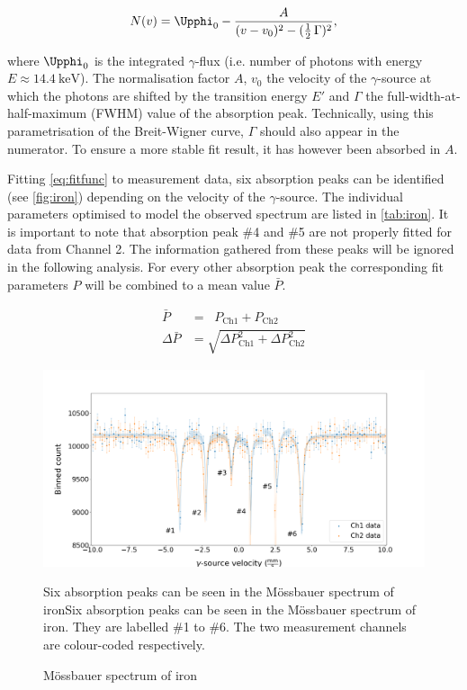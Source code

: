 \begin{equation}
\label{eq:fitfunc}
N(v) = \Upphi_0 - \frac{A}{(v-v_0)^2 - (\frac{1}{2}\,\Gamma)^2},
\end{equation}

where $\Upphi_0$ is the integrated $\gamma$-flux (i.e. number of photons with energy 
$E\approx\SI{14.4}{\kilo\electronvolt}$). The normalisation factor $A$, $v_0$ the 
velocity of the $\gamma$-source at which the photons are shifted by the transition 
energy $E'$ and $\Gamma$ the full-width-at-half-maximum (FWHM) value of the 
absorption peak. Technically, using this parametrisation of the Breit-Wigner curve, 
$\Gamma$ should also appear in the numerator. To ensure a more stable fit result, 
it has however been absorbed in $A$.

Fitting \autoref{eq:fitfunc} to measurement data, six absorption peaks can be 
identified (see \autoref{fig:iron}) depending on the velocity of the $\gamma$-source.
The individual parameters optimised to model the observed spectrum are listed in 
\autoref{tab:iron}. It is important to note that absorption peak \#4 and \#5 are not 
properly fitted for data from Channel 2. The information gathered from these peaks
will be ignored in the following analysis. For every other absorption peak the
corresponding fit parameters $P$ will be combined to a mean value $\bar{P}$.



\begin{align*}
	\bar{P} &= \;\;P_\text{Ch1} + P_\text{Ch2} \\[0.5cm]
	\Delta\bar{P} &= \sqrt{\Delta P_\text{Ch1}^2 + \Delta P_\text{Ch2}^2  } 
\end{align*}

\begin{figure}
	\label{fig:iron}
	\includegraphics[width=1.0\textwidth]{./fig/Iron.png}
	\caption{Mössbauer spectrum of iron}{Six absorption peaks can be seen in the
	Mössbauer spectrum of ironSix absorption peaks can be seen in the
	Mössbauer spectrum of iron. They are labelled \#1 to \#6. The two measurement
	channels are colour-coded respectively.}
\end{figure}

